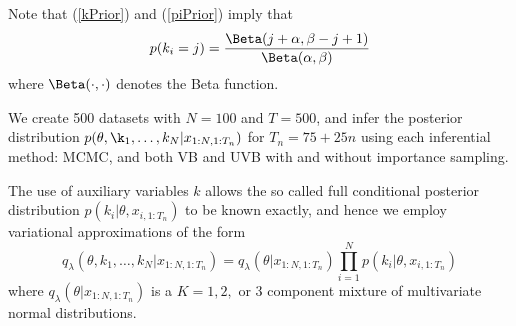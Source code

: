 \documentclass[12pt,a4paper]{article}\usepackage[]{graphicx}\usepackage[]{color}
\begin{document}
Note that (\ref{kPrior}) and (\ref{piPrior}) imply that 
\begin{equation}
\label{kMarginal}
p(k_i = j) = \frac{\Beta(j + \alpha, \beta - j + 1)}{\Beta(\alpha, \beta)}
\end{equation}
where $\Beta(\cdot, \cdot)$ denotes the Beta function.

We create 500 datasets with $N = 100$ and $T = 500$, and infer the posterior distribution $p(\theta, \k_1, \dots, k_N | x_{1:N, 1:T_n})$ for $T_n = 75 + 25n$ using each inferential method: MCMC, and both VB and UVB with and without importance sampling.

The use of auxiliary variables $k$ allows the so called full conditional posterior distribution $p(k_i | \theta, x_{i, 1:T_n})$ to be known exactly, and hence we employ variational approximations of the form 
\begin{equation}
\label{mixNormalQ}
q_{\lambda}(\theta, k_1, \dots, k_N | x_{1:N, 1:T_n}) = q_{\lambda}(\theta | x_{1:N, 1:T_n}) \prod_{i=1}^N p(k_i | \theta, x_{i, 1:T_n})
\end{equation}
where $q_{\lambda}(\theta | x_{1:N, 1:T_n})$ is a $K = 1, 2,$ or $3$ component mixture of multivariate normal distributions. 



\end{document}
